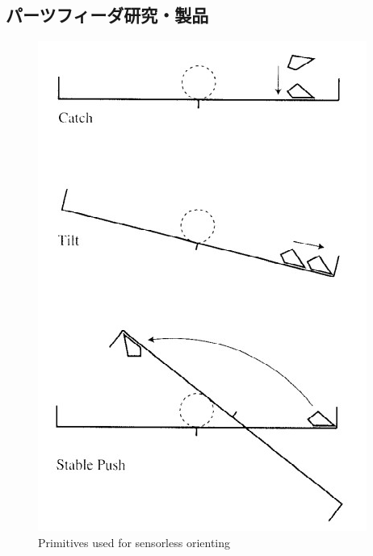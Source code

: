 \documentclass[a4paper,twoside,12pt,papersize, dvipdfmx]{iirthesis}
\begin{document}
\subsection{パーツフィーダ研究・製品}
\begin{figure}[b]
\begin{minipage}{0.49\hsize}
\centering
\includegraphics[width=0.9\hsize]{fig/Introduction/Akella/sensorless_movement.jpg}
\caption{Primitives used for sensorless orienting \cite{akella2000}}
\label{fig::sensmov}
\end{minipage}
\begin{minipage}{0.5\hsize}
\centering

\end{minipage}
\end{figure}
\end{document}
